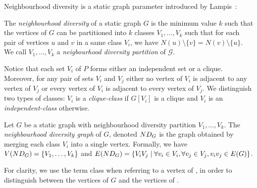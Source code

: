 Neighbourhood diversity is a static graph parameter
introduced by Lampis~\cite{Lampis12}:


\begin{definition}
  The \emph{neighbourhood diversity} of a static graph $G$ is the minimum value $k$ such that the vertices of $G$ can be partitioned into $k$ classes $V_1,\dots,V_k$ such that 
%
  for each pair of vertices $u$ and $v$ in a same class $V_i$, we have $N(u) \setminus \{v\} = N(v) \setminus \{u\}$.  We call $V_1,\dots,V_k$ a \emph{neigbourhood diversity partition} of $\mathcal{G}$.
\end{definition}

Notice that each set $V_i$ of $P$ forms either an independent set or a clique. Moreover, for any pair of sets $V_i$ and $V_j$ either no vertex of $V_i$ is adjacent to any vertex of $V_j$ or every vertex of $V_i$ is adjacent to every vertex of $V_j$. We distinguish two types of classes: $V_i$ is a \emph{clique-class} if $G[V_i]$ is a clique and $V_i$ is an \emph{independent-class} otherwise.
%

%


 \begin{definition}
 Let $G$ be a static graph with neighbourhood diversity partition $V_1,\dots,V_k$. The \emph{neighbourhood diversity graph} of $G$, denoted $\ndg[G]$ is the graph obtained by merging each class $V_i$ into a single vertex. Formally, we have $V(\ndg[G]) = \{V_1,\dots,V_k\}$ and $E(\ndg[G]) = \{V_iV_j \mid \forall v_i \in V_i, \forall v_j\in V_j, v_iv_j \in E(G)\}$.
\end{definition}


%
For clarity, we use the term class when referring to a vertex of \ndg[G], in order to distinguish between the vertices of $G$ and the vertices of \ndg[G].
%

